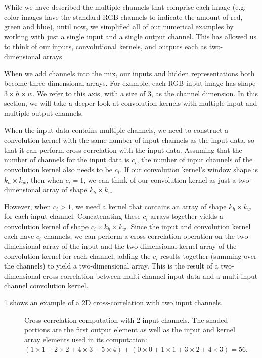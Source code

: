 While we have described the multiple channels that comprise each image (e.g. color images have the standard RGB channels to indicate the amount of red, green and blue), until now, we simplified all of our numerical examples by working with just a single input and a single output channel. This has allowed us to think of our inputs, convolutional kernels, and outputs each as two-dimensional arrays.

When we add channels into the mix, our inputs and hidden representations both become three-dimensional arrays. For example, each RGB input image has shape $3\times h\times w$. We refer to this axis, with a size of 3, as the channel dimension. In this section, we will take a deeper look at convolution kernels with multiple input and multiple output channels.


When the input data contains multiple channels, we need to construct a convolution kernel with the same number of input channels as the input data, so that it can perform cross-correlation with the input data. Assuming that the number of channels for the input data is $c_i$, the number of input channels of the convolution kernel also needs to be $c_i$. If our convolution kernel’s window shape is $k_h\times k_w$, then when $c_i=1$, we can think of our convolution kernel as just a two-dimensional array of shape $k_h\times k_w$.

However, when $c_i>1$, we need a kernel that contains an array of shape $k_h\times k_w$ for each input channel. Concatenating these $c_i$ arrays together yields a convolution kernel of shape $c_i\times k_h\times k_w$. Since the input and convolution kernel each have $c_i$ channels, we can perform a cross-correlation operation on the two-dimensional array of the input and the two-dimensional kernel array of the convolution kernel for each channel, adding the $c_i$ results together (summing over the channels) to yield a two-dimensional array. This is the result of a two-dimensional cross-correlation between multi-channel input data and a multi-input channel convolution kernel.

\cref{fig:conv_multi_in} shows an example of a 2D cross-correlation with two input channels. 

\begin{figure}[hpt]
	\centering
	
	\caption{Cross-correlation computation with 2 input channels. The shaded portions are the first output element as well as the input and kernel array elements used in its computation:  $(1 \times 1+2 \times 2+4\times3+5\times4)+(0\times0+1 \times 1+3\times2+4\times3)=56.$}
	\label{fig:conv_multi_in}
\end{figure}

